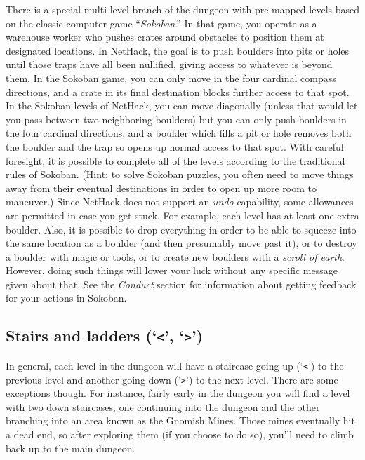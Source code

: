 \documentclass[titlepage]{article}
\begin{document}
There is a special multi-level branch of the dungeon with pre-mapped levels
based on the classic computer game ``\textit{Sokoban}.''
In that game, you operate as a warehouse worker who pushes crates around
obstacles to position them at designated locations.
In NetHack, the goal is to push boulders into pits or holes until those
traps have all been nullified, giving access to whatever is beyond them.
In the Sokoban game, you can only move in the four cardinal compass
directions, and a crate in its final destination blocks further access
to that spot.
In the Sokoban levels of NetHack, you can move diagonally (unless that
would let you pass between two neighboring boulders) but you can only
push boulders in the four cardinal directions, and a boulder which fills
a pit or hole removes both the boulder and the trap so opens up normal
access to that spot.
With careful foresight, it is possible to complete all of the levels
according to the traditional rules of Sokoban.
(Hint: to solve Sokoban puzzles, you often need to move things away from
their eventual destinations in order to open up more room to maneuver.)
Since NetHack does not support an \textit{undo} capability, some allowances
are permitted in case you get stuck.
For example, each level has at least one extra boulder.
Also, it is possible to drop everything in order to be able to squeeze
into the same location as a boulder (and then presumably move past it),
or to destroy a boulder with magic or tools, or to create new boulders
with a \textit{scroll of earth}.
However, doing such things will lower your luck without any specific
message given about that.
See the \textit{Conduct} section for information about getting feedback for
your actions in Sokoban.

\subsection*{Stairs and ladders (`\texttt{<}', `\texttt{>}')}

In general, each level in the dungeon will have a staircase going up
(`\texttt{<}') to the previous level and another going down (`\texttt{>}')
to the next
level.  There are some exceptions though.  For instance, fairly early
in the dungeon you will find a level with two down staircases, one
continuing into the dungeon and the other branching into an area
known as the Gnomish Mines.  Those mines eventually hit a dead end,
so after exploring them (if you choose to do so), you'll need to
climb back up to the main dungeon.
\end{document}

